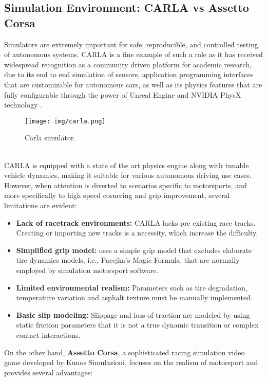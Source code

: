 \documentclass[a4paper,final,12pt]{report}
\begin{document}
\subsection{Simulation Environment: CARLA vs Assetto Corsa}
Simulators are extremely important for safe, reproducible, and controlled testing of autonomous systems. CARLA is a fine example of such a role as it has received widespread recognition as a community driven platform for academic research, due to its end to end simulation of sensors, application programming interfaces that are customizable for autonomous cars, as well as its physics features that are fully configurable through the power of Unreal Engine and NVIDIA PhysX technology \cite{carla2024}.\\
\begin{figure}[hbtp]
\centering
\texttt{[image: img/carla.png]}
\caption{Carla simulator. \cite{driverBehaviorCarla2021}}
\label{figura:carlaSimulator}
\end{figure} 
\\CARLA is equipped with a state of the art physics engine along with tunable vehicle dynamics, making it suitable for various autonomous driving use cases. However, when attention is diverted to scenarios specific to motorsports, and more specifically to high speed cornering and grip improvement, several limitations are evident:

\begin{itemize}
    \item \textbf{Lack of racetrack environments:}  CARLA lacks pre existing race tracks. Creating or importing new tracks is a necessity, which increase the difficulty.
    \item \textbf{Simplified grip model:} uses a simple grip model that excludes elaborate tire dynamics models, i.e., Pacejka's Magic Formula, that are normally employed by simulation motorsport software.
    \item \textbf{Limited environmental realism:} Parameters such as tire degradation, temperature variation and asphalt texture must be manually implemented.
    \item \textbf{Basic slip modeling:} Slippage and loss of traction are modeled by using static friction parameters that it is not a true dynamic transition or complex contact interactions.
\end{itemize}

On the other hand, \textbf{Assetto Corsa}, a sophisticated racing simulation video game developed by Kunos Simulazioni, focuses on the realism of motorsport and provides several advantages\cite{kunosAssetto2023}:
\end{document}
